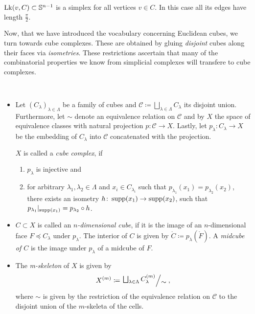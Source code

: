 \begin{rem}
  \(\operatorname{Lk}(v,C) \subset \mathbb{S}^{n-1}\) is a simplex for all vertices \(v \in C\). In this case all its edges have length \(\frac{\pi}{2}\).
\end{rem}

Now, that we have introduced the vocabulary concerning Euclidean cubes, we turn towards cube complexes. These are obtained by gluing \emph{disjoint} cubes along their faces via \emph{isometries}. These restrictions ascertain that many of the combinatorial properties we know from simplicial complexes will transfere to cube complexes.

\begin{defin}\ 
  \begin{itemize}
  \item Let \((C_\lambda)_{\lambda \in \Lambda}\) be a family of cubes and \(\mathcal{C} \coloneqq \bigsqcup_{\lambda \in \Lambda} C_\lambda\) its disjoint union. Furthermore, let \(\sim\) denote an equivalence relation on \(\mathcal{C}\) and by \(X\) the space of equivalence classes with natural projection \(p \colon \mathcal{C} \to X\). Lastly, let \(p_\lambda \colon C_\lambda \to X\) be the embedding of \(C_\lambda\) into \(\mathcal{C}\) concatenated with the projection.

    \(X\) is called a \emph{cube complex}, if
    \begin{enumerate}
    \item \(p_\lambda\) is injective and
    \item for arbitrary \(\lambda_1, \lambda_2 \in \Lambda\) and \(x_i \in C_{\lambda_i}\) such that \(p_{\lambda_1}(x_1) = p_{\lambda_2}(x_2)\), there exists an isometry \(h\colon \operatorname{supp}(x_1) \to \operatorname{supp}(x_2)\), such that \(p_{\lambda_1}|_{\operatorname{supp}(x_1)} = p_{\lambda_2} \circ h\).
    \end{enumerate}
  \item \(C \subset X\) is called an \emph{\(n\)-dimensional cube}, if it is the image of an \(n\)-dimensional face \(F \preceq C_\lambda\) under \(p_\lambda\). The interior of \(C\) is given by \(\mathring C \coloneqq p_\lambda(\mathring F)\). A \emph{midcube of \(C\)} is the image under \(p_\lambda\) of a midcube of \(F\).
  \item The \emph{m-skeleton} of \(X\) is given by
    \begin{align*}
      X^{(m)} \coloneqq \quot{\bigsqcup_{\lambda \in \Lambda} C_\lambda^{(m)}}{\sim},
    \end{align*}
    where \(\sim\) is given by the restriction of the equivalence relation on \(\mathcal{C}\) to the disjoint union of the \(m\)-skeleta of the cells.


\end{itemize}
\end{defin}
